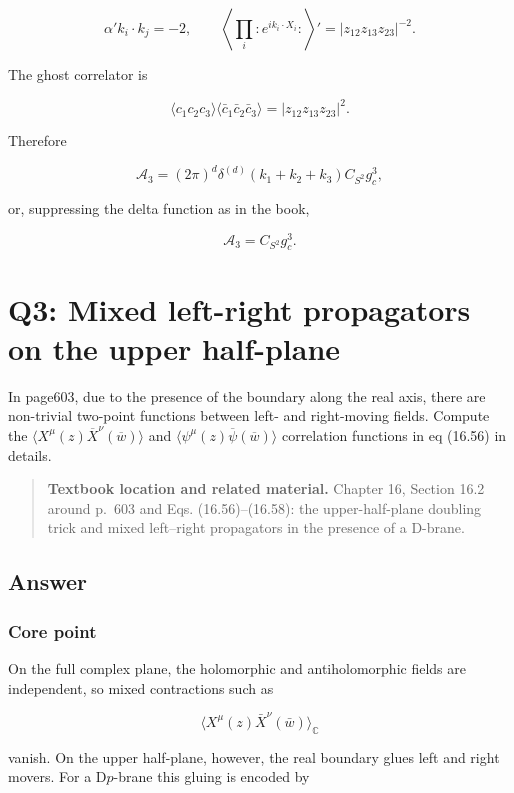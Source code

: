 \documentclass[
  10pt,
  a4paper,
  openany]{book}
\begin{document}
\[
\alpha'k_i\cdot k_j=-2,
\qquad
\left\langle\prod_i:e^{ik_i\cdot X_i}:\right\rangle'
=|z_{12}z_{13}z_{23}|^{-2}.
\]

The ghost correlator is

\[
\langle c_1c_2c_3\rangle
\langle\bar c_1\bar c_2\bar c_3\rangle
=|z_{12}z_{13}z_{23}|^2.
\]

Therefore

\[
\boxed{
\mathcal A_3
=(2\pi)^d\delta^{(d)}(k_1+k_2+k_3)
C_{S^2}g_c^3,
}
\]

or, suppressing the delta function as in the book,

\[
\boxed{
\mathcal A_3=C_{S^2}g_c^3.
}
\]

\section{Q3: Mixed left-right propagators on the upper
half-plane}\label{q3-mixed-left-right-propagators-on-the-upper-half-plane}

In page603, due to the presence of the boundary along the real axis,
there are non-trivial two-point functions between left- and right-moving
fields. Compute the
\(\langle X^\mu(z)\overline{X}^\nu(\overline{w})\rangle\) and
\(\langle\psi^\mu(z)\overline{\psi}(\overline{w})\rangle\) correlation
functions in eq (16.56) in details.

\begin{quote}
\textbf{Textbook location and related material.} Chapter 16, Section
16.2 around p.~603 and Eqs. (16.56)--(16.58): the upper-half-plane
doubling trick and mixed left--right propagators in the presence of a
D-brane.
\end{quote}

\subsection{Answer}\label{answer-32}

\subsubsection{Core point}\label{core-point-32}

On the full complex plane, the holomorphic and antiholomorphic fields
are independent, so mixed contractions such as

\[
\langle X^\mu(z)\bar X^\nu(\bar w)\rangle_{\mathbb C}
\]

vanish. On the upper half-plane, however, the real boundary glues left
and right movers. For a D\(p\)-brane this gluing is encoded by
\end{document}
